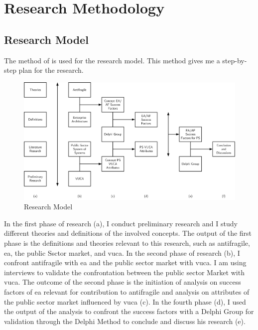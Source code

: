\chapter{Research Methodology}
\label{ch:research-methodology}

\section{Research Model}
\label{sec:research-model}
The method of \textcite{Verschuren2016} is used for the research model. This method gives me a step-by-step plan for the research.
	\begin{figure}[h]
		\centering
		\includegraphics[width=14cm]{images/researchmodel.png}
		\caption[Research Model]{Research Model}
		\label{fig:research-model}
	\end{figure}

In the first phase of research (a), I conduct preliminary research and I study different theories and definitions of the involved concepts. The output of the first phase is the definitions and theories relevant to this research, such as \gls{antifragile}, \acrlong{ea}, the public Ssctor market, and \acrshort{vuca}. In the second phase of research (b), I confront \gls{antifragile} with \acrlong{ea} and the public sector market with \acrshort{vuca}. I am using interviews to validate the confrontation between the public sector Market with \acrshort{vuca}. The outcome of the second phase is the initiation of analysis on success factors of \acrlong{ea} relevant for contribution to \gls{antifragile} and analysis on attributes of the public sector market influenced by \acrshort{vuca} (c). In the fourth phase (d), I used the output of the analysis to confront the success factors with a Delphi Group for validation through the Delphi Method to conclude and discuss his research (e).

